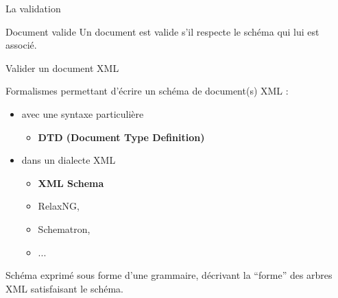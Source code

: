 \begin{frame}[allowframebreaks]{La validation}
\begin{block}{Document valide}
Un document est \alert{valide} s'il respecte le schéma qui lui est associé.
\end{block}

\end{frame}


\begin{frame}{Valider un document XML}

Formalismes permettant d'écrire un schéma de document(s) XML :

\begin{itemize}

\item avec une syntaxe particulière

\begin{itemize}
\item \textbf<4>{DTD (Document Type Definition)} 
\end{itemize}

\item dans un dialecte XML

\begin{itemize}
\item \textbf<4>{XML Schema} 
\item RelaxNG, 
\item Schematron,
\item ...
\end{itemize}

\end{itemize}

Schéma exprimé sous forme d'une grammaire, décrivant la ``forme'' des arbres XML satisfaisant le schéma.

\end{frame}



